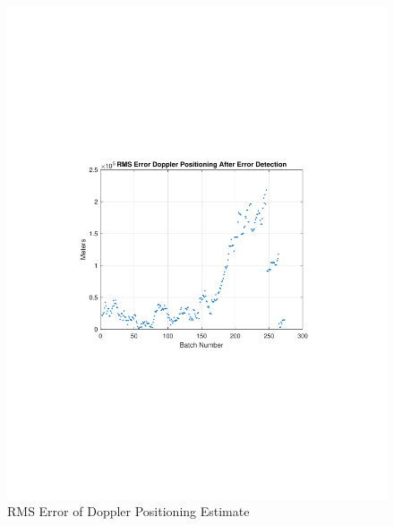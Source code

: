 \documentclass[12pt]{report}
\begin{document}
\begin{figure}[h!]
    \centering
    \includegraphics[trim=1.2in 3.3in 1.75in 3.3in,clip,width=5in]
    {Irid_15min_USRP_DopplerRMSE.pdf}
    \caption{RMS Error of Doppler Positioning Estimate}
    \label{fig:USRPDoppler15minIridRMSE}
\end{figure}
\end{document}
